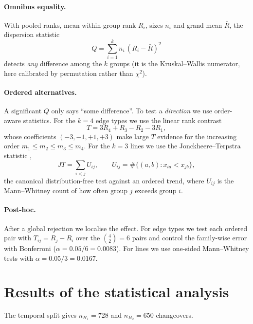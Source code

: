 \documentclass[11pt,a4paper]{article}
\begin{document}
\paragraph{Omnibus equality.}
With pooled ranks, mean within-group rank $R_i$, sizes $n_i$ and grand mean
$\bar R$, the dispersion statistic
\begin{equation}
Q=\sum_{i=1}^{k} n_i\,(R_i-\bar R)^2
\end{equation}
detects \emph{any} difference among the $k$ groups (it is the
Kruskal--Wallis numerator, here calibrated by permutation rather than $\chi^2$).

\paragraph{Ordered alternatives.}
A significant $Q$ only says ``some difference''. To test a \emph{direction} we use
order-aware statistics. For the $k=4$ edge types we use the linear rank contrast
\begin{equation}
T=3R_4+R_3-R_2-3R_1,
\end{equation}
whose coefficients $(-3,-1,+1,+3)$ make large $T$ evidence for the increasing
order $m_1\le m_2\le m_3\le m_4$. For the $k=3$ lines we use the
Jonckheere--Terpstra statistic \cite{jonckheere1954,terpstra1952},
\begin{equation}
JT=\sum_{i<j}U_{ij},\qquad
U_{ij}=\#\{(a,b): x_{ia}<x_{jb}\},
\end{equation}
the canonical distribution-free test against an ordered trend, where $U_{ij}$ is
the Mann--Whitney count of how often group $j$ exceeds group $i$.

\paragraph{Post-hoc.}
After a global rejection we localise the effect. For edge types we test each
ordered pair with $T_{ij}=R_j-R_i$ over the $\binom{4}{2}=6$ pairs and control the
family-wise error with Bonferroni ($\alpha=0.05/6=0.0083$). For lines we use
one-sided Mann--Whitney tests \cite{mannwhitney1947} with $\alpha=0.05/3=0.0167$.

\section{Results of the statistical analysis}\label{sec:results}
The temporal split gives $n_{H_1}=728$ and $n_{H_2}=650$ changeovers.
\end{document}
